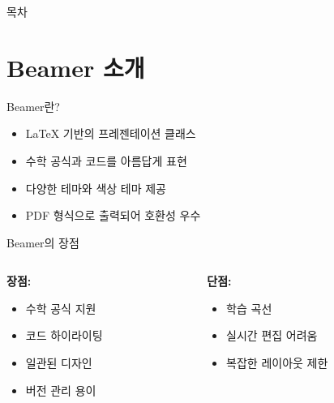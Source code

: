 \documentclass[aspectratio=169]{beamer}
\begin{document}
\begin{frame}
    \titlepage
\end{frame}

\begin{frame}{목차}
    \tableofcontents
\end{frame}

\section{Beamer 소개}

\begin{frame}{Beamer란?}
    \begin{itemize}
        \item<1-> LaTeX 기반의 프레젠테이션 클래스
        \item<2-> 수학 공식과 코드를 아름답게 표현
        \item<3-> 다양한 테마와 색상 테마 제공
        \item<4-> PDF 형식으로 출력되어 호환성 우수
    \end{itemize}
\end{frame}

\begin{frame}{Beamer의 장점}
    \begin{columns}
        \begin{column}{0.5\textwidth}
            \textbf{장점:}
            \begin{itemize}
                \item 수학 공식 지원
                \item 코드 하이라이팅
                \item 일관된 디자인
                \item 버전 관리 용이
            \end{itemize}
        \end{column}
        \begin{column}{0.5\textwidth}
            \textbf{단점:}
            \begin{itemize}
                \item 학습 곡선
                \item 실시간 편집 어려움
                \item 복잡한 레이아웃 제한
            \end{itemize}
        \end{column}
    \end{columns}
\end{frame}
\end{document}
